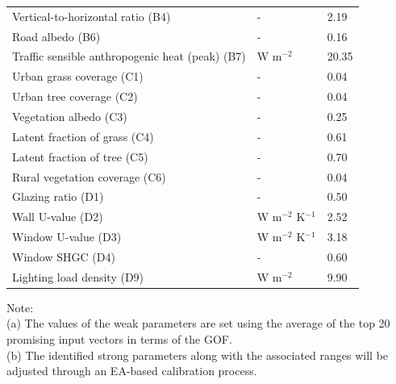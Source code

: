 \begin{table}[!h]
\begin{center}
\begin{tabular}{lll}
Vertical-to-horizontal ratio (B4)                 & -           & 2.19             \\
Road albedo (B6)                                  & -           & 0.16             \\
Traffic sensible anthropogenic heat (peak) (B7)   & W m$^{-2}$       & 20.35            \\
Urban grass coverage (C1)                         & -           & 0.04             \\
Urban tree coverage (C2)                          & -           & 0.04             \\
Vegetation albedo (C3)                            & -           & 0.25             \\
Latent fraction of grass (C4)                     & -           & 0.61             \\
Latent fraction of tree (C5)                      & -           & 0.70             \\
Rural vegetation coverage (C6)                    & -           & 0.04             \\
Glazing ratio (D1)                                & -           & 0.50             \\
Wall U-value (D2)                                 & W m$^{-2}$ K$^{-1}$   & 2.52             \\
Window U-value (D3)                               & W m$^{-2}$ K$^{-1}$   & 3.18             \\
Window SHGC (D4)                                  & -           & 0.60             \\
Lighting load density (D9)                        & W m$^{-2}$       & 9.90             \\
\bottomrule
\end{tabular}
\end{center}
Note: \\
(a) The values of the weak parameters are set using the average of the top 20 promising input vectors in terms of the GOF. \\
(b) The identified strong parameters along with the associated ranges will be adjusted through an EA-based calibration process.
\end{table}

